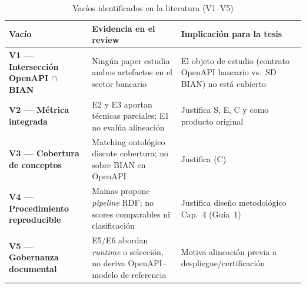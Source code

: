 \begin{table}[H]
  \centering
  \caption{Vacíos identificados en la literatura (V1--V5)}
  \label{tab:vacios}
  \small
  \begin{tabular}{@{}p{}p{}p{}@{}}
    \toprule
    \textbf{Vacío} & \textbf{Evidencia en el review} & \textbf{Implicación para la tesis} \\
    \midrule
    \textbf{V1 --- Intersección OpenAPI $\cap$ BIAN} &
    Ningún paper estudia ambos artefactos en el sector bancario &
    El objeto de estudio (contrato OpenAPI bancario vs.\ SD BIAN) no está cubierto \\
    \textbf{V2 --- Métrica integrada} &
    E2 y E3 aportan técnicas parciales; E1 no evalúa alineación &
    Justifica S, E, C y \AlignmentScore{} como producto original \\
    \textbf{V3 --- Cobertura de conceptos} &
    Matching ontológico discute cobertura; no sobre \BusinessObject{} BIAN en OpenAPI &
    Justifica \CoverageScore{} (C) \\
    \textbf{V4 --- Procedimiento reproducible} &
    Mainas propone \textit{pipeline} RDF; no scores comparables ni clasificación &
    Justifica diseño metodológico Cap.~4 (Guía~1) \\
    \textbf{V5 --- Gobernanza documental} &
    E5/E6 abordan \textit{runtime} o selección, no deriva OpenAPI--modelo de referencia &
    Motiva alineación previa a despliegue/certificación \\
    \bottomrule
  \end{tabular}
\end{table}
